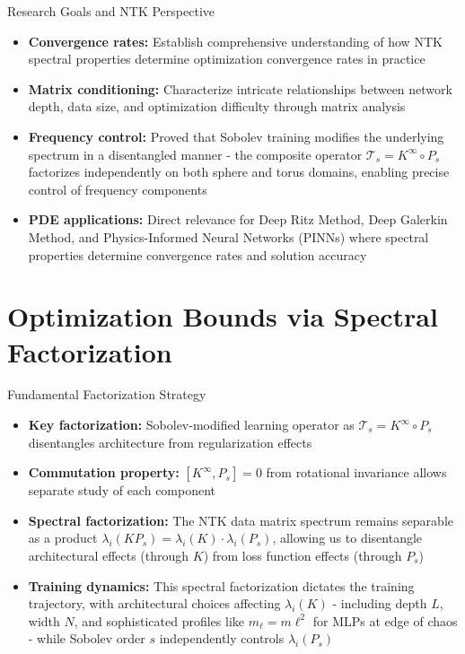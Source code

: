 \documentclass{beamer}
\begin{document}
\begin{frame}{Research Goals and NTK Perspective}
\begin{itemize}
\item \textbf{Convergence rates:} Establish comprehensive understanding of how NTK spectral properties determine optimization convergence rates in practice

\item \textbf{Matrix conditioning:} Characterize intricate relationships between network depth, data size, and optimization difficulty through matrix analysis

\item \textbf{Frequency control:} Proved that Sobolev training modifies the underlying spectrum in a disentangled manner - the composite operator $\mathcal{T}_s = K^{\infty} \circ P_s$ factorizes independently on both sphere and torus domains, enabling precise control of frequency components

\item \textbf{PDE applications:} Direct relevance for Deep Ritz Method, Deep Galerkin Method, and Physics-Informed Neural Networks (PINNs) where spectral properties determine convergence rates and solution accuracy
\end{itemize}
\end{frame}

\section{Optimization Bounds via Spectral Factorization}

\begin{frame}{Fundamental Factorization Strategy}
\begin{itemize}
\item \textbf{Key factorization:} Sobolev-modified learning operator as $\mathcal{T}_s = K^{\infty} \circ P_s$ disentangles architecture from regularization effects

\item \textbf{Commutation property:} $[K^{\infty}, P_s] = 0$ from rotational invariance allows separate study of each component
\item \textbf{Spectral factorization:} The NTK data matrix spectrum remains separable as a product $\lambda_i(KP_s) = \lambda_i(K) \cdot \lambda_i(P_s)$, allowing us to disentangle architectural effects (through $K$) from loss function effects (through $P_s$)

\item \textbf{Training dynamics:} This spectral factorization dictates the training trajectory, with architectural choices affecting $\lambda_i(K)$ - including depth $L$, width $N$, and sophisticated profiles like $m_\ell = m\ell^2$ for MLPs at edge of chaos - while Sobolev order $s$ independently controls $\lambda_i(P_s)$
\end{itemize}
\end{frame}
\end{document}
